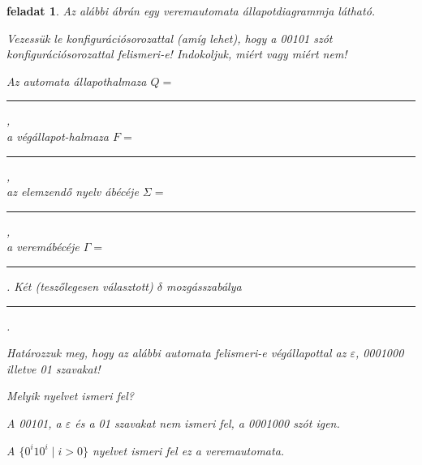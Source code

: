 \documentclass[a4paper]{article}
\newtheorem{feladat}{feladat}[section]
\newcommand{\spacer}[1][2 cm]{\rule{#1}{.4pt}\rule{0pt}{2em} }
\begin{document}
\begin{feladat}%
Az alábbi ábrán egy veremautomata állapotdiagrammja látható.


Vezessük le konfigurációsorozattal (amíg lehet), hogy a 00101 szót
konfigurációsorozattal felismeri-e! Indokoljuk, miért vagy miért nem!

Az automata állapothalmaza $Q=$~\spacer[.4\linewidth],\\
a végállapot-halmaza $F=$~\spacer[.5\linewidth],\\
az elemzendő nyelv ábécéje $\Sigma=$~\spacer,\\
a veremábécéje $\Gamma=$~\spacer.
Két (teszőlegesen választott) $\delta$ mozgásszabálya\\ \spacer[.95\linewidth].

Határozzuk meg, hogy az alábbi automata felismeri-e végállapottal az
$\varepsilon$, 0001000 illetve 01 szavakat!

Melyik nyelvet ismeri fel?

\begin{megoldas}
A 00101, a $\varepsilon$ és a 01 szavakat nem ismeri fel, a 0001000 szót
igen.

A $\{0^i10^i \mid i>0\}$ nyelvet ismeri fel ez a veremautomata.
\end{megoldas}
\end{feladat}
\end{document}
